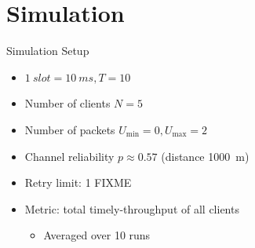 \documentclass{beamer}
\begin{document}
\section{Simulation}
\begin{frame}{Simulation Setup}
  \begin{itemize}
    \item $\SI{1}{slot} = \SI{10}{ms}, T=10$
    \item Number of clients $N=5$
    \item Number of packets $U_\text{min}=0, U_\text{max}=2$
    \item Channel reliability $p\approx0.57$ (distance \SI{1000}{m})
    \item Retry limit: 1 FIXME
    \item Metric: total timely-throughput of all clients
      \begin{itemize}
	\item Averaged over 10 runs
      \end{itemize}
  \end{itemize}
\end{frame}
\end{document}
